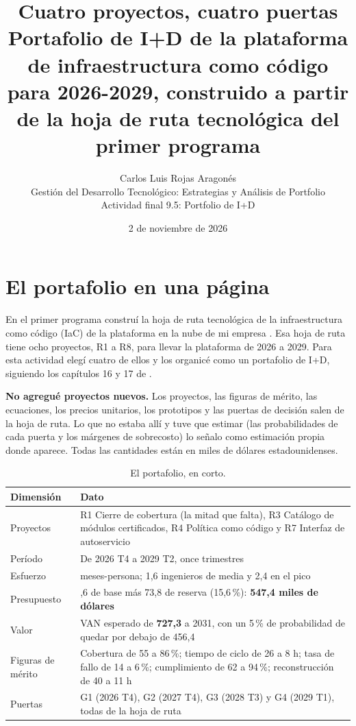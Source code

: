 \documentclass[11pt,letterpaper]{article}
\title{\vspace{-1.2cm}\textbf{Cuatro proyectos, cuatro puertas}\\
\large Portafolio de I+D de la plataforma de infraestructura como código para
2026-2029, construido a partir de la hoja de ruta tecnológica del primer
programa}
\author{Carlos Luis Rojas Aragonés\\
\small Gestión del Desarrollo Tecnológico: Estrategias y Análisis de Portfolio\\
\small Actividad final 9.5: Portfolio de I+D}
\date{\small 2 de noviembre de 2026}
\newcommand{\pct}{\,\%}
\begin{document}
\maketitle
\vspace{-0.8em}

\section{El portafolio en una página}
\label{sec:ficha}

En el primer programa construí la hoja de ruta tecnológica de la
infraestructura como código (IaC) de la plataforma en la nube de mi empresa
\autocite{rojas2026hoja}. Esa hoja de ruta tiene ocho proyectos, R1 a R8, para
llevar la plataforma de 2026 a 2029. Para esta actividad elegí cuatro de ellos y
los organicé como un portafolio de I+D, siguiendo los capítulos 16 y 17 de
\textcite{deweck2022}.

\textbf{No agregué proyectos nuevos.} Los proyectos, las figuras de mérito, las
ecuaciones, los precios unitarios, los prototipos y las puertas de decisión
salen de la hoja de ruta. Lo que no estaba allí y tuve que estimar (las
probabilidades de cada puerta y los márgenes de sobrecosto) lo señalo como
estimación propia donde aparece. Todas las cantidades están en miles de dólares
estadounidenses.

\begin{table}[H]
\centering
\footnotesize
\setlength{\tabcolsep}{4pt}
\caption{El portafolio, en corto.}
\label{tab:ficha}
\begin{tabularx}{\textwidth}{@{}>{\raggedright\arraybackslash}p{3.0cm}>{\raggedright\arraybackslash}X@{}}
\toprule
\textbf{Dimensión} & \textbf{Dato} \\
\midrule
Proyectos & R1 Cierre de cobertura (la mitad que falta), R3 Catálogo de módulos
  certificados, R4 Política como código y R7 Interfaz de autoservicio \\
Período & De 2026 T4 a 2029 T2, once trimestres \\
Esfuerzo & 54 meses-persona; 1,6 ingenieros de media y 2,4 en el pico \\
Presupuesto & 473,6 de base más 73,8 de reserva (15,6\pct): \textbf{547,4
  miles de dólares} \\
Valor & VAN esperado de \textbf{727,3} a 2031, con un 5\pct{} de probabilidad
  de quedar por debajo de 456,4 \\
Figuras de mérito & Cobertura de 55 a 86\pct; tiempo de ciclo de 26 a 8 h;
  tasa de fallo de 14 a 6\pct; cumplimiento de 62 a 94\pct;
  reconstrucción de 40 a 11 h \\
Puertas & G1 (2026 T4), G2 (2027 T4), G3 (2028 T3) y G4 (2029 T1), todas
  de la hoja de ruta \\
\bottomrule
\end{tabularx}
\end{table}
\end{document}
